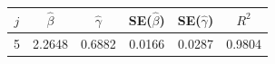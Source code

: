 \begin{tabular}{cccccc}
\toprule
$j$ & $\hat{\beta}$ & $\hat{\gamma}$ & SE($\hat{\beta}$) & SE($\hat{\gamma}$) & $R^2$ \\
\midrule
5 & 2.2648 & 0.6882 & 0.0166 & 0.0287 & 0.9804 \\
\bottomrule
\end{tabular}